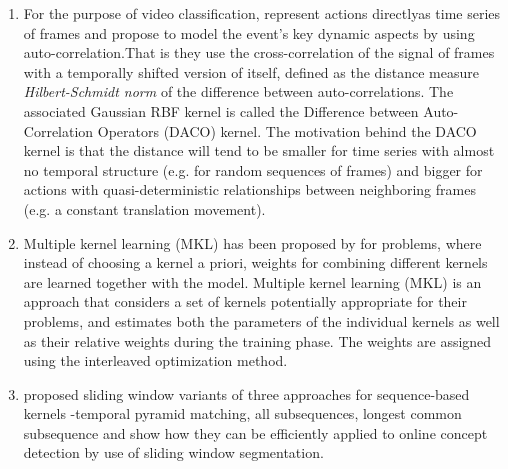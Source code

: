 \begin{enumerate}
\item For the purpose of video classification,\citet{DACO} represent actions directlyas time series of frames and propose to model the event's key dynamic aspects by using auto-correlation.That is they use the cross-correlation of the signal of frames with a temporally shifted version of itself, defined as the distance measure \textit{Hilbert-Schmidt norm} of the difference between auto-correlations. The associated Gaussian RBF kernel is called the Difference between Auto-Correlation Operators (DACO) kernel. The motivation behind the DACO kernel is that the distance will tend to be smaller for time series with almost no temporal structure (e.g. for random sequences of frames) and bigger for actions with quasi-deterministic relationships between neighboring frames (e.g. a constant translation movement). 



\item Multiple kernel learning (MKL) has been proposed by \citet{MKL} for problems, where instead of choosing a kernel a priori, weights for combining different kernels are learned together with the model. Multiple kernel learning (MKL) is an approach that considers
a set of kernels potentially appropriate for their problems, and estimates both the parameters of the individual kernels as well as their relative weights during the training
phase. The weights are assigned using the interleaved optimization method.

\item \citet{Online_Concept} proposed sliding window variants of three approaches for sequence-based kernels -temporal pyramid matching, all subsequences, longest common subsequence and show how they can be efficiently applied to online concept detection by use of sliding window segmentation.
 \end{enumerate}

% 
%
%